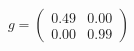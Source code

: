 \documentclass[preview]{standalone}
\begin{document}
\begin{align*}
g = \begin{pmatrix} 0.49 & 0.00 \\ 0.00 & 0.99 \end{pmatrix}
\end{align*}
\end{document}
